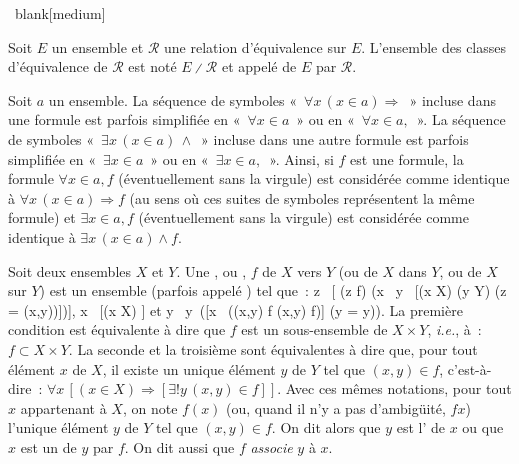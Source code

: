 \done

\ blank[medium]

\noindent{} Soit $E$ un ensemble et $\mathcal{R}$ une relation d'équivalence sur $E$.
    L'ensemble des classes d'équivalence de $\mathcal{R}$ est noté $E \divslash \mathcal{R}$ et appelé \emph{} de $E$ par $\mathcal{R}$.

\stopsubsection

\startsubsection[title=Fonctions, reference=sub:fonctions]

Soit $a$ un ensemble. 
La séquence de symboles « $\forall x \, (x \in a) \Rightarrow$ » incluse dans une formule est parfois simplifiée en « $\forall x \in a$ » ou en « $\forall x \in a,$ ».
La séquence de symboles « $\exists x \, (x \in a) \, \wedge$ » incluse dans une autre formule est parfois simplifiée en « $\exists x \in a$ » ou en « $\exists x \in a,$ ». 
Ainsi, si $f$ est une formule, la formule $\forall x \in a, f$ (éventuellement sans la virgule) est considérée comme identique à $\forall x \, (x \in a) \Rightarrow f$ (au sens où ces suites de symboles représentent la même formule) et $\exists x \in a, f$ (éventuellement sans la virgule) est considérée comme identique à $\exists x \, (x \in a) \wedge f$.

\blank[medium]

\noindent{} Soit deux ensembles $X$ et $Y$. Une \emph{}, ou \emph{}, $f$ de $X$ vers $Y$ (ou de $X$ dans $Y$, ou de $X$ sur $Y$) est un ensemble (parfois appelé \emph{}) tel que : 
\startformula
    \forall z \, [ (z \in f) \Rightarrow (\exists x \, \exists y \, [(x \in X) \wedge (y \in Y) \wedge (z = (x,y))])],
\stopformula
\startformula
    \forall x \, [(x \in X) \Rightarrow [\exists y \, (x,y) \in f]]
\stopformula
et 
\startformula
    \forall y \, \forall y\p \, ([\exists x \, ((x,y) \in f \wedge (x,y\p) \in f)] \Rightarrow (y = y\p)).
\stopformula
La première condition est équivalente à dire que $f$ est un sous-ensemble de $X \times Y$, \emph{i.e.}, à : $f \subset X \times Y$. 
La seconde et la troisième sont équivalentes à dire que, pour tout élément $x$ de $X$, il existe un unique élément $y$ de $Y$ tel que $(x,y) \in f$, c'est-à-dire : $\forall x \, [(x \in X) \Rightarrow [\exists ! y \, (x,y) \in f]]$. 
Avec ces mêmes notations, pour tout $x$ appartenant à $X$, on note $f(x)$ (ou, quand il n'y a pas d'ambigüité, $f x$) l'unique élément $y$ de $Y$ tel que $(x,y) \in f$. 
On dit alors que $y$ est l'\emph{} de $x$ ou que $x$ est un \emph{} de $y$ par $f$. 
On dit aussi que $f$ \emph{associe} $y$ à $x$. 

